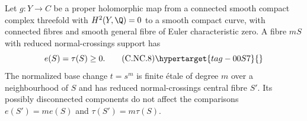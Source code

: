 
\begin{proposition}\hypertarget{tag-01CA}{}\label{cdp:st:C.2.NC.3}


Let $g:Y\to C$ be a proper holomorphic map from a connected smooth compact complex threefold with $H^2(Y,\Q)=0$ to a smooth compact curve, with connected fibres and smooth general fibre of Euler characteristic zero. A fibre $mS$ with reduced normal-crossings support has
\[
 e(S)=\tau(S)\ge0.
 \tag{C.NC.8}\hypertarget{tag-00S7}{}\label{cdp:eq:C.NC.8}
\]
The normalized base change $t=s^m$ is finite étale of degree $m$ over a neighbourhood of $S$ and has reduced normal-crossings central fibre $S'$. Its possibly disconnected components do not affect the comparisons
$e(S')=m e(S)$ and $\tau(S')=m\tau(S)$.
\end{proposition}

